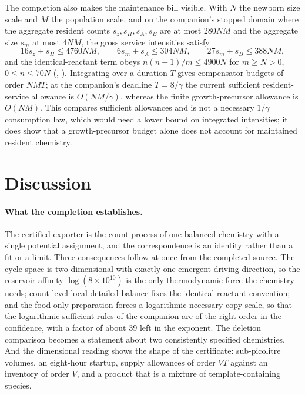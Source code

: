 \documentclass[11pt,a4paper]{article}
\theoremstyle{plain}
\theoremstyle{definition}
\theoremstyle{remark}
\begin{document}
The completion also makes the maintenance bill visible. With $N$ the newborn size scale and $M$ the population scale, and on the companion's stopped domain where the aggregate resident counts $s_z,s_H,s_A,s_B$ are at most $280NM$ and the aggregate size $s_m$ at most $4NM$, the gross service intensities satisfy
\[
 16s_z+s_H\le4760NM,\qquad 6s_m+s_A\le304NM,\qquad 27s_m+s_B\le388NM,
\]
and the identical-reactant term obeys $n(n-1)/m\le4900N$ for $m\ge N>0$, $0\le n\le70N$ (, ). Integrating over a duration $T$ gives compensator budgets of order $NMT$; at the companion's deadline $T=8/\gamma$ the current sufficient resident-service allowance is $O(NM/\gamma)$, whereas the finite growth-precursor allowance is $O(NM)$. This compares sufficient allowances and is not a necessary $1/\gamma$ consumption law, which would need a lower bound on integrated intensities; it does show that a growth-precursor budget alone does not account for maintained resident chemistry.

\section{Discussion}\label{sec:discussion}

\paragraph{What the completion establishes.}
The certified exporter is the count process of one balanced chemistry with a single potential assignment, and the correspondence is an identity rather than a fit or a limit. Three consequences follow at once from the completed source. The cycle space is two-dimensional with exactly one emergent driving direction, so the reservoir affinity $\log(8\times10^{10})$ is the only thermodynamic force the chemistry needs; count-level local detailed balance fixes the identical-reactant convention; and the food-only preparation forces a logarithmic necessary copy scale, so that the logarithmic sufficient rules of the companion are of the right order in the confidence, with a factor of about $39$ left in the exponent. The deletion comparison becomes a statement about two consistently specified chemistries. And the dimensional reading shows the shape of the certificate: sub-picolitre volumes, an eight-hour startup, supply allowances of order $VT$ against an inventory of order $V$, and a product that is a mixture of template-containing species.
\end{document}
